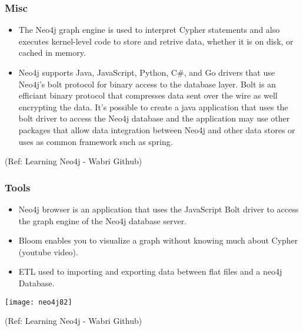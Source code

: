 \begin{frame}\frametitle{Misc }

\begin{itemize}
\item The Neo4j graph engine is used to interpret Cypher statements and also executes kernel-level code to store and retrive data, whether it is on disk, or cached in memory.
\item Neo4j supports Java, JavaScript, Python, C\#, and Go drivers that use Neo4j's bolt protocol for binary access to the database layer. Bolt is an efficiant binary protocol that compresses data sent over the wire as well encrypting the data. It's possible to create a java application that uses the bolt driver to access the Neo4j database and the application may use other packages that allow data integration between Neo4j and other data stores or uses as common framework such as spring.
\end{itemize}


{\tiny (Ref: Learning Neo4j - Wabri Github)}
\end{frame}

\begin{frame}\frametitle{Tools }

\begin{itemize}
\item Neo4j browser is an application that uses the JavaScript Bolt driver to access the graph engine of the Neo4j database server.
\item Bloom enables you to visualize a graph without knowing much about Cypher (youtube video).
\item  ETL used to importing and exporting data between flat files and a neo4j Database.
\end{itemize}

\begin{center}
\texttt{[image: neo4j82]}
\end{center}	

{\tiny (Ref: Learning Neo4j - Wabri Github)}
\end{frame}


